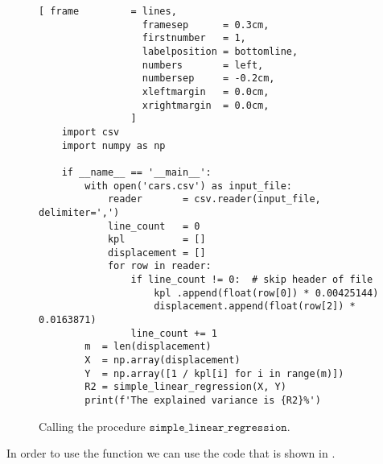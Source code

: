 \begin{figure}[!ht]
\centering
\begin{Verbatim}[ frame         = lines, 
                  framesep      = 0.3cm, 
                  firstnumber   = 1,
                  labelposition = bottomline,
                  numbers       = left,
                  numbersep     = -0.2cm,
                  xleftmargin   = 0.0cm,
                  xrightmargin  = 0.0cm,
                ]
    import csv
    import numpy as np
    
    if __name__ == '__main__':
        with open('cars.csv') as input_file:
            reader       = csv.reader(input_file, delimiter=',')
            line_count   = 0
            kpl          = []
            displacement = []
            for row in reader:
                if line_count != 0:  # skip header of file
                    kpl .append(float(row[0]) * 0.00425144) 
                    displacement.append(float(row[2]) * 0.0163871)  
                line_count += 1
        m  = len(displacement)
        X  = np.array(displacement)
        Y  = np.array([1 / kpl[i] for i in range(m)])
        R2 = simple_linear_regression(X, Y)
        print(f'The explained variance is {R2}%')
\end{Verbatim}
\vspace*{-0.3cm}
\caption{Calling the procedure $\mathtt{simple\_linear\_regression}$.}
\label{fig:simple_linear_regression.py:test}
\end{figure}
In order to use the function we can use the code that is shown in 
.
